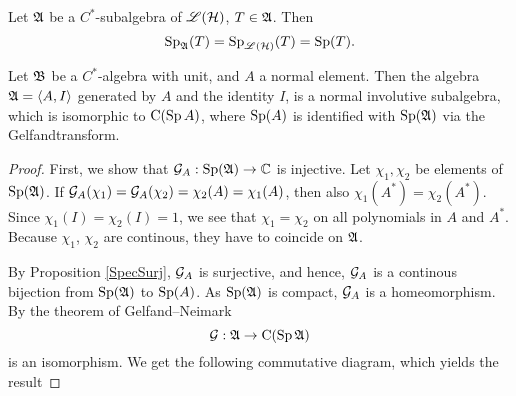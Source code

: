 \begin{cor}
 Let $\mathfrak{A}$ be a $C^*$-subalgebra of $\mathscr{L}(\mathcal{H})$, $T \in \mathfrak{A}$. Then 
\[
 \operatorname{Sp}_{\mathfrak{A}} (T) = \operatorname{Sp}_{\mathscr{L}(\mathcal{H})}(T) = \operatorname{Sp}(T).
\]
\end{cor}

\begin{prop}\label{boundedfunccalc}
 Let $\mathfrak{B}$ be a $C^*$-algebra with unit, and $A$ a normal element.
 Then the algebra $\mathfrak{A} = \left\langle A, I \right\rangle$ generated by $A$ and the identity $I$, is a
 normal involutive subalgebra, which is isomorphic to 
 $\operatorname{C} (\operatorname{Sp} A)$, where $\operatorname{Sp}(A)$ is identified with $\operatorname{Sp}(\mathfrak{A})$ via the Gelfandtransform.
\end{prop}

\begin{proof}
 First, we show that $\mathcal{G}_A : \operatorname{Sp}(\mathfrak{A}) \to \mathbb{C}$ is injective. Let 
 $\chi_1 , \chi_2$ be elements of $\operatorname{Sp}(\mathfrak{A})$. If $\mathcal{G}_A(\chi_1) = \mathcal{G}_A(\chi_2)=
 \chi_2(A)=\chi_1(A)$, then also $\chi_1(A^*)=\chi_2(A^*)$. Since 
 $\chi_1(I)=\chi_2(I)=1$, we see that $\chi_1 = \chi_2$ on all polynomials
 in $A$ and $A^*$. Because $\chi_1$, $\chi_2$ are continous, they have to coincide on
 $\mathfrak{A}$. 
 
 By Proposition \ref{SpecSurj}, $\mathcal{G}_A$ is surjective, and hence, $\mathcal{G}_A$ is a continous bijection 
 from $\operatorname{Sp}(\mathfrak{A})$ to $\operatorname{Sp}(A)$. As $\operatorname{Sp}(\mathfrak{A})$ is compact,
 $\mathcal{G}_A$ is a homeomorphism.
By the theorem of Gelfand--Neimark 
\[
 \mathcal{G} : \mathfrak{A} \to \operatorname{C}(\operatorname{Sp} \mathfrak{A})
\]
is an isomorphism. We get the following commutative diagram, which yields the result

% 
% 
%  
% 
%   


\end{proof}
